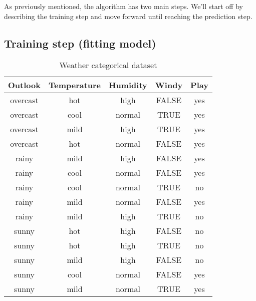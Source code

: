 As previously mentioned, the algorithm has two main steps. We'll start off by describing the training step and move forward until reaching the prediction step.

\subsection{Training step (fitting model)}

\begin{table}[]
	\renewcommand{\arraystretch}{1.3}
	\caption{Weather categorical dataset}
	\label{tbl:weather_categorical_dataset}
	\centering
	\begin{tabular}{|c|c|c|c||c|}
		\hline
		Outlook  & Temperature & Humidity & Windy & Play \\ \hline \hline
		overcast &  hot        &  high    &  FALSE & yes \\ \hline
		overcast &  cool       &  normal  &  TRUE  & yes \\ \hline
		overcast &  mild       &  high    &  TRUE  & yes \\ \hline
		overcast &  hot        &  normal  &  FALSE & yes \\ \hline
		rainy    &  mild       &  high    &  FALSE & yes \\ \hline
		rainy    &  cool       &  normal  &  FALSE & yes \\ \hline
		rainy    &  cool       &  normal  &  TRUE  & no \\ \hline
		rainy    &  mild       &  normal  &  FALSE & yes \\ \hline
		rainy    &  mild       &  high    &  TRUE  & no \\ \hline
		sunny    &  hot        &  high    &  FALSE & no \\ \hline
		sunny    &  hot        &  high    &  TRUE  & no \\ \hline
		sunny    &  mild       &  high    &  FALSE & no \\ \hline
		sunny    &  cool       &  normal  &  FALSE & yes \\ \hline
		sunny    &  mild       &  normal  &  TRUE  & yes \\ \hline
	\end{tabular}
\end{table}

